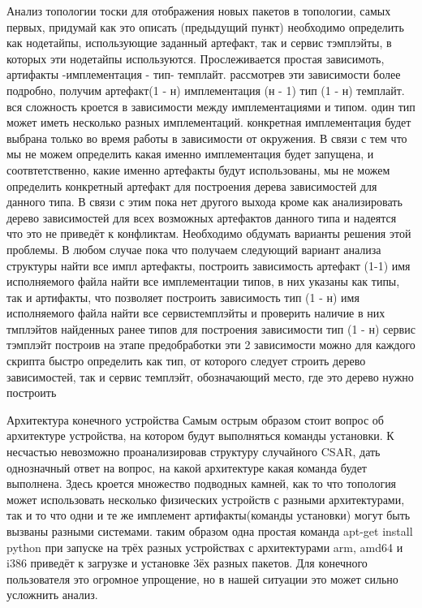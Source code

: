 Анализ топологии тоски
для отображения новых пакетов в топологии, самых первых, придумай как это описать (предыдущий пункт) необходимо определить как нодетайпы, использующие заданный артефакт, так и сервис тэмплэйты, в которых эти нодетайпы используются.
Прослеживается простая зависимоть, артифакты -имплементация - тип- темплайт. рассмотрев эти зависимости более подробно, получим  артефакт(1 - н) имплементация (н - 1) тип (1 - н) темплайт.
вся сложность кроется в зависимости между имплементациями и типом. один тип может иметь несколько разных имплементаций. конкретная имплементация будет выбрана только во время работы в зависимости от окружения. В связи с тем что мы не можем определить какая именно имплементация будет запущена, и соотвтетственно, какие именно артефакты будут использованы, мы не можем определить конкретный артефакт для построения дерева зависимостей для данного типа. В связи с этим пока нет другого выхода кроме как анализировать дерево зависимостей для всех возможных артефактов данного типа и надеятся что это не приведёт к конфликтам. Необходимо обдумать варианты решения этой проблемы.
В любом случае пока что получаем следующий вариант анализа структуры
найти все импл артефакты, построить зависимость артефакт (1-1) имя исполняемого файла
найти все имплементации типов, в них указаны как типы, так и артифакты, что позволяет построить зависимость тип (1 - н) имя исполняемого файла
найти все сервистемплэйты и проверить наличие в них тмплэйтов найденных ранее типов для построения зависимости тип (1 - н) сервис тэмплэйт
построив на этапе предобработки эти 2 зависимости можно для каждого скрипта быстро определить как тип, от которого следует строить дерево зависимостей, так и сервис темплэйт, обозначающий место, где это дерево нужно построить

Архитектура конечного устройства
Самым острым образом стоит вопрос об архитектуре устройства, на котором будут выполняться команды установки. 
К несчастью невозможно проанализировав структуру случайного CSAR, дать однозначный ответ на вопрос, на какой архитектуре какая команда будет выполнена. Здесь кроется множество подводных камней, как то что топология может использовать несколько физических устройств с разными архитектурами, так и то что одни и те же имплемент артифакты(команды установки) могут быть вызваны разными системами. таким образом одна простая команда apt-get install python при запуске на трёх разных устройствах с архитектурами arm, amd64 и i386 приведёт к загрузке и установке 3ёх разных пакетов. Для конечного пользователя это огромное упрощение, но в нашей ситуации это может сильно усложнить анализ.

